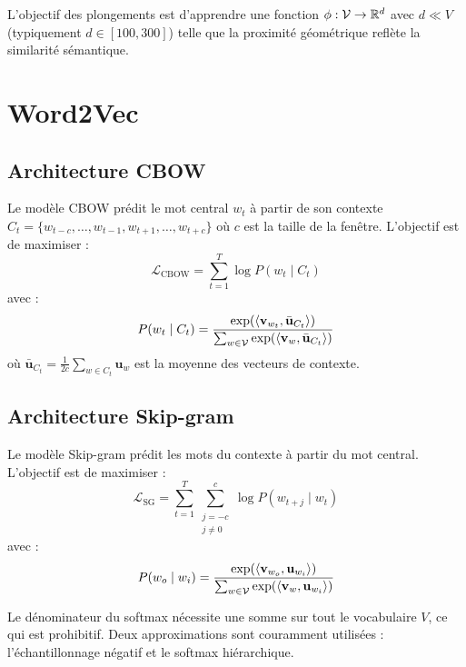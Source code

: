 L'objectif des plongements est d'apprendre une fonction
$\phi : \mathcal{V} \to \mathbb{R}^d$ avec $d \ll V$ (typiquement $d \in [100, 300]$)
telle que la proximit\'e g\'eom\'etrique refl\`ete la similarit\'e s\'emantique.

\section{Word2Vec}
\label{sec:plg:word2vec}

\subsection{Architecture CBOW}

\begin{definition}
Le mod\`ele CBOW pr\'edit le mot central $w_t$ \`a partir de son contexte
$C_t = \{w_{t-c}, \ldots, w_{t-1}, w_{t+1}, \ldots, w_{t+c}\}$ o\`u $c$ est
la taille de la fen\^etre. L'objectif est de maximiser :
\[
\mathcal{L}_{\text{CBOW}} = \sum_{t=1}^{T} \log P(w_t \mid C_t)
\]
avec :
\[
P(w_t \mid C_t) = \frac{\exp(\langle \mathbf{v}_{w_t}, \bar{\mathbf{u}}_{C_t} \rangle)}{\sum_{w \in \mathcal{V}} \exp(\langle \mathbf{v}_w, \bar{\mathbf{u}}_{C_t} \rangle)}
\]
o\`u $\bar{\mathbf{u}}_{C_t} = \frac{1}{2c} \sum_{w \in C_t} \mathbf{u}_w$
est la moyenne des vecteurs de contexte.
\end{definition}

\subsection{Architecture Skip-gram}

\begin{definition}
Le mod\`ele Skip-gram pr\'edit les mots du contexte \`a partir du mot central.
L'objectif est de maximiser :
\[
\mathcal{L}_{\text{SG}} = \sum_{t=1}^{T} \sum_{\substack{j=-c \\ j \neq 0}}^{c} \log P(w_{t+j} \mid w_t)
\]
avec :
\[
P(w_o \mid w_i) = \frac{\exp(\langle \mathbf{v}_{w_o}, \mathbf{u}_{w_i} \rangle)}{\sum_{w \in \mathcal{V}} \exp(\langle \mathbf{v}_w, \mathbf{u}_{w_i} \rangle)}
\]
\end{definition}

\begin{attention}[title=\textbf{Co\^ut du softmax}]
Le d\'enominateur du softmax n\'ecessite une somme sur tout le vocabulaire $V$,
ce qui est prohibitif. Deux approximations sont couramment utilis\'ees :
l'\'echantillonnage n\'egatif et le softmax hi\'erarchique.
\end{attention}

